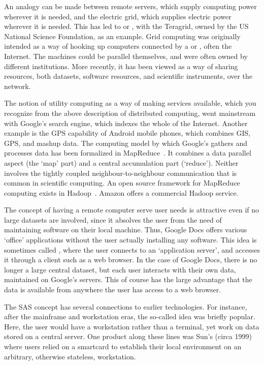 An analogy can be made between remote servers, which supply computing
power wherever it is needed, and the electric grid, which supplies
electric power wherever it is needed. This has led to  or , with the Teragrid,
owned by the US National Science Foundation, as an example. Grid
computing was originally intended as a way of hooking up computers
connected by a  or , often the Internet. The machines
could be parallel themselves, and were often owned by different
institutions. More recently, it has been viewed as a way of sharing
resources, both datasets, software resources, and scientific
instruments, over the network.

The notion of utility computing as a way of making services available,
which you recognize from the above description of distributed
computing, went mainstream
with Google's search engine, which
indexes the whole of the Internet. Another example is the GPS capability
of Android mobile phones, which combines GIS, GPS, and mashup
data. The computing model by which Google's gathers and processes data
has been formalized in
MapReduce~\cite{Google:mapreduce}. It combines a data parallel aspect (the
`map' part) and a central accumulation part (`reduce'). Neither
involves the tightly coupled neighbour-to-neighbour communication that
is common in scientific computing.
%
An open
source framework for MapReduce computing exists in
Hadoop~\cite{Hadoop-wiki}. Amazon offers a commercial Hadoop service.

The concept of having a remote computer serve user needs is attractive
even if no large datasets are involved, since it absolves the user
from the need of maintaining software on their local machine. Thus,
Google Docs offers various `office'
applications without the user actually installing any software. This
idea is sometimes called , where
the user connects to an `application server', and accesses it through
a client such as a web browser. In the case of Google Docs, there is
no longer a large central dataset, but each user interacts with their
own data, maintained on Google's servers. This of course has the large
advantage that the data is available from anywhere the user has access
to a web browser.

The \ac{SAS} concept has several connections to earlier
technologies. For instance, after the mainframe and workstation eras,
the so-called  idea was briefly popular. Here,
the user would have a workstation rather than a terminal, yet work on
data stored on a central server. One product along these lines was
Sun's  (circa 1999) where users relied on a smartcard to
establish their local environment on an arbitrary, otherwise stateless,
workstation.

